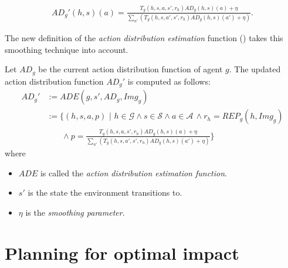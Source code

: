\begin{align}
\label{eq:adu}
    AD_g'(h,s)(a) = \frac{T_g(h,s,a,s', r_h) AD_g(h,s)(a) + \eta}{\sum_{a'} (T_g(h,s,a',s', r_h) AD_g(h,s)(a') + \eta)}.
\end{align}

The new definition of the \textit{action distribution estimation} function () takes this smoothing technique into account.

\begin{definition} 
\label{def:actupnew}
Let $AD_g$ be the current action distribution function of agent $g$. The updated action distribution function $AD_g'$ is computed as follows:
\begin{align*}
     AD_g' &:= ADE(g, s', AD_g, Img_g) \\&:= \Bigg\{(h,s,a,p) \,\,\Bigg| \,\, h \in \mathcal{G} \land s \in \mathcal{S} \land a \in \mathcal{A} \,\land r_h = REP_g(h,Img_g)
     \\& \,\,\,\,\,\,\,\,\,\,\, \land p =  \frac{T_g(h,s,a,s', r_h) AD_g(h,s)(a) + \eta}{\sum_{a'} (T_g(h,s,a',s', r_h) AD_g(h,s)(a') + \eta)} \Bigg\}
\end{align*}
where
\begin{itemize}
    \item $ADE$ is called the \textit{action distribution estimation function}.
    \item $s'$ is the state the environment transitions to.
    \item $\eta$ is the \textit{smoothing parameter}.
\end{itemize}
\end{definition}













\section{Planning for optimal impact}
\label{sec:planningoptimal}

